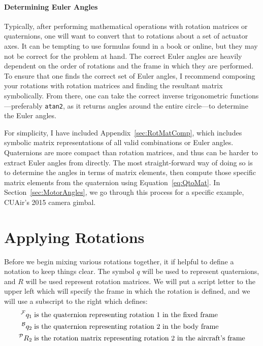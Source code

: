 \documentclass[letterpaper,10pt]{article}
\newcommand\leftidx[3]{%
  {\vphantom{#2}}#1#2#3%
}
\begin{document}
\paragraph{Determining Euler Angles}
\label{sec:DetEulerAngles}
Typically, after performing mathematical operations with rotation matrices or quaternions, one will want to convert that to rotations about a set of actuator axes. It can be tempting to use formulas found in a book or online, but they may not be correct for the problem at hand. The correct Euler angles are heavily dependent on the order of rotations and the frame in which they are performed. To ensure that one finds the correct set of Euler angles, I recommend composing your rotations with rotation matrices and finding the resultant matrix symbolically. From there, one can take the correct inverse trigonometric functions---preferably \texttt{atan2}, as it returns angles around the entire circle---to determine the Euler angles.

For simplicity, I have included Appendix~\ref{sec:RotMatComp}, which includes symbolic matrix representations of all valid combinations or Euler angles. Quaternions are more compact than rotation matrices, and thus can be harder to extract Euler angles from directly. The most straight-forward way of doing so is to determine the angles in terms of matrix elements, then compute those specific matrix elements from the quaternion using Equation~\ref{eq:QtoMat}. In Section~\ref{sec:MotorAngles}, we go through this process for a specific example, CUAir's 2015 camera gimbal. 

\section{Applying Rotations}
Before we begin mixing various rotations together, it if helpful to define a notation to keep things clear. The symbol $q$ will be used to represent quaternions, and $R$ will be used represent rotation matrices. We will put a script letter to the upper left which will specify the frame in which the rotation is defined, and we will use a subscript to the right which defines:
\begin{align}
\leftidx{\mathcal{^F}}{q}{_1} & \; \text{is the quaternion representing rotation 1 in the fixed frame} \\
\leftidx{\mathcal{^B}}{q}{_2} & \; \text{is the quaternion representing rotation 2 in the body frame} \\
\leftidx{\mathcal{^P}}{R}{_2} & \; \text{is the rotation matrix representing rotation 2 in the aircraft's frame}
\end{align}
\end{document}
